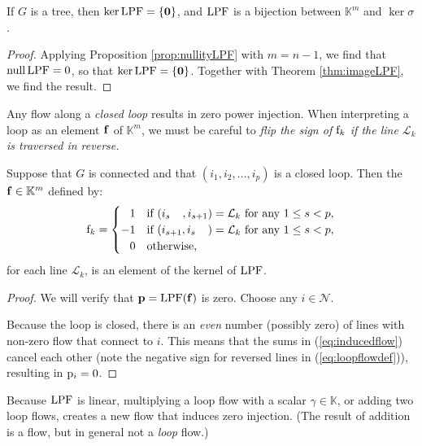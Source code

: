 \documentclass[main.tex]{subfiles}
\begin{document}
\begin{corollary}
If $G$ is a tree, then $\ker \text{\textup{LPF}} = \{\mathbf{0}\}$, and $\text{\textup{LPF}}$ is a bijection between $\mathbb{K}^m$ and $\ker \sigma$.
\end{corollary} 
\begin{proof}
Applying Proposition \ref{prop:nullityLPF} with $m = n-1$, we find that $\operatorname{null} \text{\textup{LPF}} = 0$, so that ${\ker \text{\textup{LPF}} = \{\mathbf{0}\}}$. Together with Theorem \ref{thm:imageLPF}, we find the result.
\end{proof}


Any flow along a \emph{closed loop} results in zero power injection. When interpreting a loop as an element $\mathbf{f}$ of $\mathbb{K}^m$, we must be careful to \emph{flip the sign of ${\mathrm{f}}_k$ if the line $\mathcal{L}_k$ is traversed in reverse.}

\begin{theorem}\label{thm:loopflowkernel}
Suppose that $G$ is connected and that $(i_1, i_2, \dots, i_p)$ is a closed loop. Then the  $\mathbf{f} \in \mathbb{K}^m$ defined by:
\begin{gather}
    \mel{f}_k = \begin{cases}
    \hphantom{-}1 & \text{if } (i_s\hphantom{_{+1}}, i_{s+1})=\mathcal{L}_k \text{ for any } 1 \leq s < p,\\
    -1 & \text{if } (i_{s+1}, i_s\hphantom{_{+1}})=\mathcal{L}_k \text{ for any } 1 \leq s < p,\\
    \hphantom{-}0 & \text{otherwise,}
    \end{cases}\label{eq:loopflowdef}
\end{gather}
for each line $\mathcal{L}_k$, is an element of the kernel of $\text{\textup{LPF}}$.
\end{theorem}
\begin{proof}
We will verify that $\mathbf{p}=\text{\textup{LPF}}(\mathbf{f})$ is zero. 
Choose any $i \in \mathcal{N}$.

Because the loop is closed, there is an \emph{even} number (possibly zero) of lines with non-zero flow that connect to $i$. This means that the sums in (\ref{eq:inducedflow}) cancel each other (note the negative sign for reversed lines in (\ref{eq:loopflowdef})), resulting in ${\mathrm{p}}_i=0$.
\end{proof}

\begin{remark}
Because $\text{\textup{LPF}}$ is linear, multiplying a loop flow with a scalar $\gamma \in \mathbb{K}$, or adding two loop flows, creates a new flow that induces zero injection. (The result of addition is a flow, but in general not a \emph{loop} flow.)
\end{remark}
\end{document}
